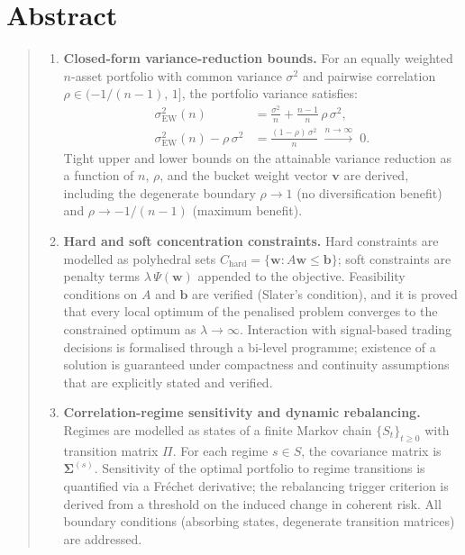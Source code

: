 \documentclass[12pt,openany]{book}
\numberwithin{equation}{chapter}
\theoremstyle{plain}
\theoremstyle{definition}
\theoremstyle{remark}
\newenvironment{abstract}{%
  \chapter*{Abstract}
  \begin{quote}\small
}{%
  \end{quote}
}
\def\mathcal#1{#1}%
\begin{document}
\begin{abstract}
\begin{enumerate}[label=\textbf{\arabic*.}, leftmargin=2em,
                  itemsep=3pt, parsep=0pt, topsep=4pt]
  \item \textbf{Closed-form variance-reduction bounds.}\enspace
        For an equally weighted $n$-asset portfolio with common
        variance $\sigma^{2}$ and pairwise correlation
        $\rho\in(-1/(n-1),\,1]$, the portfolio variance satisfies:
        \begin{align}
          \sigma^{2}_{\mathrm{EW}}(n)
          &= \frac{\sigma^{2}}{n}
             + \frac{n-1}{n}\,\rho\,\sigma^{2},
          \label{eq:abs-ew-var}\\
          \sigma^{2}_{\mathrm{EW}}(n)
             - \rho\,\sigma^{2}
          &= \frac{(1-\rho)\,\sigma^{2}}{n}
             \;\xrightarrow{n\to\infty}\; 0.
          \label{eq:abs-ew-reduction}
        \end{align}
        Tight upper and lower bounds on the attainable variance
        reduction as a function of $n$, $\rho$, and the bucket
        weight vector $\mathbf{v}$ are derived, including the
        degenerate boundary $\rho\to 1$ (no diversification benefit)
        and $\rho\to -1/(n-1)$ (maximum benefit).

  \item \textbf{Hard and soft concentration constraints.}\enspace
        Hard constraints are modelled as polyhedral sets
        $\mathcal{C}_{\mathrm{hard}}=\{\mathbf{w}: A\mathbf{w}\leq
        \mathbf{b}\}$; soft constraints are penalty terms
        $\lambda\,\Psi(\mathbf{w})$ appended to the objective.
        Feasibility conditions on $A$ and $\mathbf{b}$ are verified
        (Slater's condition), and it is proved that every local
        optimum of the penalised problem converges to the constrained
        optimum as $\lambda\to\infty$.  Interaction with
        signal-based trading decisions is formalised through a
        bi-level programme; existence of a solution is guaranteed
        under compactness and continuity assumptions that are
        explicitly stated and verified.

  \item \textbf{Correlation-regime sensitivity and dynamic
        rebalancing.}\enspace
        Regimes are modelled as states of a finite Markov chain
        $\{S_{t}\}_{t\geq 0}$ with transition matrix $\Pi$.  For each
        regime $s\in\mathcal{S}$, the covariance matrix is
        $\boldsymbol{\Sigma}^{(s)}$.  Sensitivity of the optimal
        portfolio to regime transitions is quantified via a
        Fr\'{e}chet derivative; the rebalancing trigger criterion is
        derived from a threshold on the induced change in coherent
        risk.  All boundary conditions (absorbing states, degenerate
        transition matrices) are addressed.


\end{enumerate}
\end{abstract}
\end{document}
